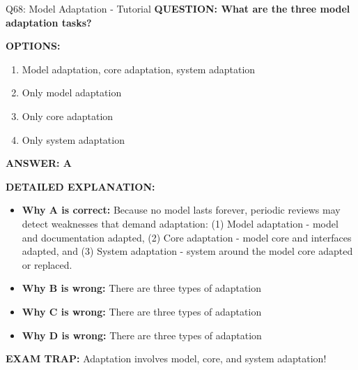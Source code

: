 \documentclass[8pt]{beamer}
\begin{document}
	\begin{frame}{Q68: Model Adaptation - Tutorial}
		\fontsize{6.5}{7.5}\selectfont
		\textbf{QUESTION: What are the three model adaptation tasks?}
		
		\vspace{0.1cm}
		\textbf{OPTIONS:}
		\begin{enumerate}
			\item Model adaptation, core adaptation, system adaptation
			\item Only model adaptation
			\item Only core adaptation
			\item Only system adaptation
		\end{enumerate}
		
		\vspace{0.1cm}
		\textcolor{myblue}{\textbf{ANSWER: A}}
		
		\vspace{0.1cm}
		\textbf{DETAILED EXPLANATION:}
		\begin{itemize}
			\item \textbf{Why A is correct:} Because no model lasts forever, periodic reviews may detect weaknesses that demand adaptation: (1) Model adaptation - model and documentation adapted, (2) Core adaptation - model core and interfaces adapted, and (3) System adaptation - system around the model core adapted or replaced.
			\item \textbf{Why B is wrong:} There are three types of adaptation
			\item \textbf{Why C is wrong:} There are three types of adaptation
			\item \textbf{Why D is wrong:} There are three types of adaptation
		\end{itemize}
		
		\textcolor{myred}{\textbf{EXAM TRAP:}} Adaptation involves \textcolor{myblue}{model, core, and system} adaptation!
	\end{frame}
	
\end{document}
